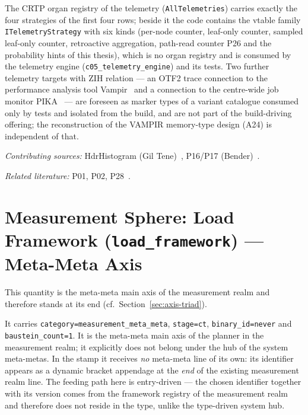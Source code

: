 The CRTP organ registry of the telemetry (\texttt{All\allowbreak{}Telemetries}) carries exactly the four strategies of the first four rows; beside it the code contains the vtable family \texttt{ITelemetry\allowbreak{}Strategy} with six kinds (per-node counter, leaf-only counter, sampled leaf-only counter, retroactive aggregation, path-read counter P26 and the probability hints of this thesis), which is no organ registry and is consumed by the telemetry engine (\texttt{c05\_\allowbreak{}telemetry\_\allowbreak{}engine}) and its tests. Two further telemetry targets with ZIH relation --- an OTF2 trace connection to the performance analysis tool Vampir~\cite{knupfer2008vampir} and a connection to the centre-wide job monitor PIKA~\cite{dietrich2020pika} --- are foreseen as marker types of a variant catalogue consumed only by tests and isolated from the build, and are not part of the build-driving offering; the reconstruction of the VAMPIR memory-type design (A24) is independent of that.

\emph{Contributing sources:} Hdr\allowbreak{}Histogram (Gil Tene)~\cite{tene_hdrhistogram}, P16/\allowbreak{}P17 (Bender)~\cite{bender2000cobtree,bender2005coboblivious}.

\emph{Related literature:} P01, P02, P28~\cite{leis2013art,binna2018hot,kuehn2023bplustree}.

\section[head={Measurement Sphere: Load Framework --- Meta-Meta Axis}]{Measurement Sphere: Load Framework (\texttt{load\_framework}) --- Meta-Meta Axis}

This quantity is the meta-meta main axis of the measurement realm and therefore stands at its end (cf.\ Section~\ref{sec:axis-triad}).

It carries \texttt{category=measurement\_\allowbreak{}meta\_\allowbreak{}meta}, \texttt{stage=ct}, \texttt{binary\_\allowbreak{}id=never} and \texttt{baustein\_\allowbreak{}count=1}. It is the meta-meta main axis of the planner in the measurement realm; it explicitly does not belong under the hub of the system meta-metas. In the stamp it receives \emph{no} meta-meta line of its own: its identifier appears as a dynamic bracket appendage at the \emph{end} of the existing measurement realm line. The feeding path here is entry-driven --- the chosen identifier together with its version comes from the framework registry of the measurement realm and therefore does not reside in the type, unlike the type-driven system hub.

